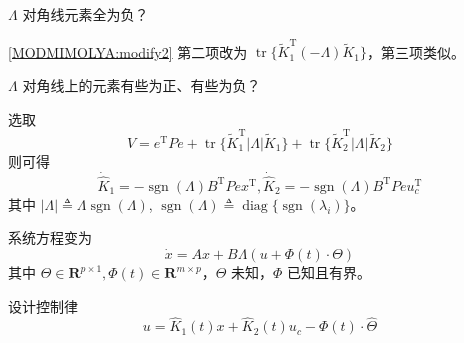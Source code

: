 \begin{problem}
    $\Lambda$ 对角线元素全为负？
\end{problem}
\begin{hint}
\eqref{MODMIMOLYA:modify2} 第二项改为 $\ensuremath{\operatorname{tr}} \{ \tilde{K}^\mathrm{T}_1 (- \Lambda) \tilde{K} _1 \}$，第三项类似。
\end{hint}
\begin{problem}
    $\Lambda$ 对角线上的元素有些为正、有些为负？
\end{problem}
\begin{hint}
    选取\[ V = e^\mathrm{T} P  e +\ensuremath{\operatorname{tr}} \{ \tilde{K}^\mathrm{T}_1 |
       \Lambda | \tilde{K} _1 \} +\ensuremath{\operatorname{tr}} \{
       \tilde{K}^\mathrm{T}_2 | \Lambda | \tilde{K} _2 \} \]
    则可得
    \[ \dot{\hat{K}} _1 = -\ensuremath{\operatorname{sgn}} (\Lambda) B^\mathrm{T}  P  e
       x^\mathrm{T}, \dot{\hat{K}} _2 = -\ensuremath{\operatorname{sgn}} (\Lambda) B^\mathrm{T}
       P  e  u^\mathrm{T}_c \]
    其中 $| \Lambda | \triangleq \Lambda \ensuremath{\operatorname{sgn}}
    (\Lambda)$, $\ensuremath{\operatorname{sgn}} (\Lambda) \triangleq
    \ensuremath{\operatorname{diag}} \{ \ensuremath{\operatorname{sgn}}
    (\lambda_i) \}$。
\end{hint}

\begin{problem}
系统方程变为
  \[ \dot{x} = A  x + B \Lambda (u + \Phi (t) \cdot \Theta) \]
  其中 $\Theta \in \mathbf{R}^{p \times 1}, \Phi (t) \in \mathbf{R}^{m \times  p}$，$\Theta$ 未知，$\Phi$ 已知且有界。
\end{problem}
\begin{hint}
    设计控制律\[ u = \hat{K}_1 (t) x + \hat{K}_2 (t) u_c - \Phi (t) \cdot \hat{\Theta} \]
\end{hint}